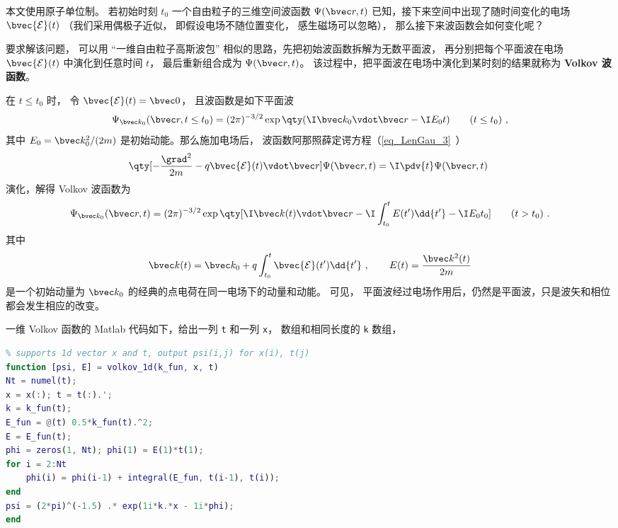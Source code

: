 
本文使用原子单位制。 若初始时刻 $t_0$ 一个自由粒子的三维空间波函数 $\Psi(\bvec r,t)$ 已知，接下来空间中出现了随时间变化的电场 $\bvec {\mathcal E}(t)$ （我们采用偶极子近似， 即假设电场不随位置变化， 感生磁场可以忽略）， 那么接下来波函数会如何变化呢？

要求解该问题， 可以用 “一维自由粒子高斯波包” 相似的思路，先把初始波函数拆解为无数平面波， 再分别把每个平面波在电场 $\bvec {\mathcal E}(t)$ 中演化到任意时间 $t$， 最后重新组合成为 $\Psi(\bvec r,t)$。 该过程中，把平面波在电场中演化到某时刻的结果就称为 \textbf{Volkov 波函数}。

在 $t \le t_0$ 时， 令 $\bvec {\mathcal E}(t) = \bvec 0$， 且波函数是如下平面波
\begin{equation}\label{eq_Volkov_3}
\Psi_{\bvec k_0}(\bvec r, t \le t_0) = (2\pi)^{-3/2} \exp\qty(\I\bvec k_0 \vdot \bvec r - \I E_0 t) \qquad (t \le t_0)~,
\end{equation}
其中 $E_0 = \bvec k_0^2/(2m)$ 是初始动能。那么施加电场后，
波函数阿那照薛定谔方程（\autoref{eq_LenGau_3}~）
\begin{equation}
\qty[-\frac{\grad^2}{2m} - q \bvec {\mathcal E}(t) \vdot \bvec r] \Psi(\bvec r,t) = \I \pdv{t} \Psi(\bvec r,t)~
\end{equation}
演化，解得 Volkov 波函数为
\begin{equation}\label{eq_Volkov_4}
\Psi_{\bvec k_0}(\bvec r, t) = (2\pi)^{-3/2} \exp\qty[\I \bvec k(t)\vdot \bvec r - \I\int_{t_0}^t E(t') \dd{t'} - \I E_0 t_0] \qquad (t > t_0)~.
\end{equation}
其中
\begin{equation}\label{eq_Volkov_5}
\bvec k(t) = \bvec k_0 + q\int_{t_0}^t \bvec {\mathcal E}(t') \dd{t'}~,
\qquad
E(t) = \frac{\bvec k^2(t)}{2m}
\end{equation}
是一个初始动量为 $\bvec k_0$ 的经典的点电荷在同一电场下的动量和动能。 可见， 平面波经过电场作用后，仍然是平面波，只是波矢和相位都会发生相应的改变。

一维 Volkov 函数的 Matlab 代码如下，给出一列 \verb`t` 和一列 \verb`x`， 数组和相同长度的 \verb`k` 数组， 
\begin{lstlisting}[language=matlab, caption=volkov\_1d.m]
% Volkov wave function in 1D
% supports 1d vector x and t, output psi(i,j) for x(i), t(j)
function [psi, E] = volkov_1d(k_fun, x, t)
Nt = numel(t);
x = x(:); t = t(:).';
k = k_fun(t);
E_fun = @(t) 0.5*k_fun(t).^2;
E = E_fun(t);
phi = zeros(1, Nt); phi(1) = E(1)*t(1);
for i = 2:Nt
    phi(i) = phi(i-1) + integral(E_fun, t(i-1), t(i));
end
psi = (2*pi)^(-1.5) .* exp(1i*k.*x - 1i*phi);
end
\end{lstlisting}

